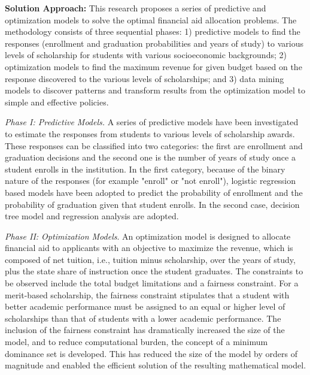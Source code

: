 \documentclass[12pt,english]{report}
\begin{document}
\newpage
\noindent \textbf{Solution Approach:}  This research proposes a series of predictive and optimization models to solve the optimal financial aid allocation problems. The methodology consists of three sequential phases: 1) predictive models to find the responses (enrollment and graduation probabilities and years of study) to various levels of scholarship for students with various socioeconomic backgrounds; 2)  optimization models to find the maximum revenue for given budget based on the response discovered to the various levels of scholarships; and 3) data mining models to discover patterns and transform results from the optimization model to simple and effective policies. %

\vspace*{.1in} 
\noindent \textit{Phase I: Predictive Models.} A series of predictive models have been investigated to estimate the responses from students to various levels of scholarship awards. These responses can be classified into two categories: the first are enrollment and graduation decisions and the second one is the number of years of study once a student enrolls in the institution. In the first category, because of the binary nature of the responses (for example "enroll" or "not enroll"), logistic regression based models have been adopted to predict the probability of enrollment and the probability of graduation given that student enrolls. In the second case, decision tree model and regression analysis are adopted.

\vspace*{.1in} 
\noindent \textit{Phase II: Optimization Models}. An optimization model is designed to allocate financial aid to applicants with an objective to maximize the revenue, which is composed of net tuition, i.e., tuition minus scholarship, over the years of study, plus the state share of instruction once the student graduates. The constraints to be observed include the total budget limitations and a fairness constraint. For a merit-based scholarship, the fairness constraint stipulates that a student with better academic performance must be assigned to an equal or higher level of scholarships than that of students with a lower academic performance. The inclusion of the fairness constraint has dramatically increased the size of the model, and to reduce computational burden, the concept of a minimum dominance set is developed.  This has reduced the size of the model by orders of magnitude and enabled the efficient solution of the resulting mathematical model. 
\end{document}

